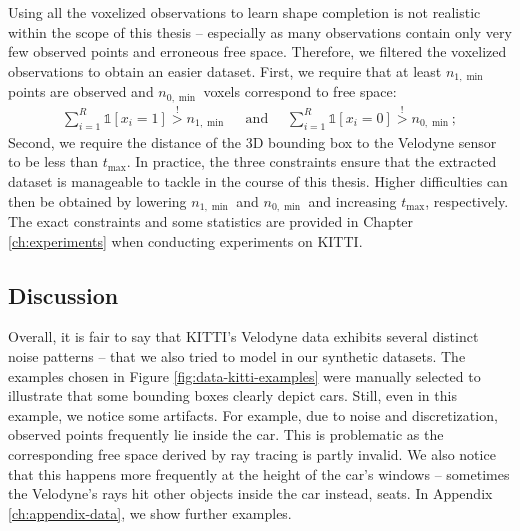 Using all the voxelized observations to learn shape completion is not
realistic within the scope of this thesis -- especially as many
observations contain only very few observed points and erroneous free space.
Therefore, we filtered the voxelized observations to obtain an easier
dataset. First, we require that at least
$n_{1,\min}$ points are observed and $n_{0, \min}$ voxels correspond
to free space:
\begin{align}
  \sum_{i = 1}^R \mathds{1}[x_i = 1] \overset{!}{>} n_{1,\min}\quad\text{ and }\quad\sum_{i = 1}^R \mathds{1}[x_i = 0] \overset{!}{>} n_{0,\min};
\end{align}
Second, we require the distance of the 3D bounding
box to the Velodyne sensor to be less than $t_{\max}$. In practice, the
three constraints ensure that the extracted dataset is manageable to tackle
in the course of this thesis. Higher difficulties can then
be obtained by lowering $n_{1,\min}$ and $n_{0,\min}$ and increasing $t_{\max}$,
respectively. The exact constraints and some statistics are provided in
Chapter \ref{ch:experiments} when conducting experiments on KITTI.

\subsection{Discussion}

Overall, it is fair to say that KITTI's Velodyne data exhibits several
distinct noise patterns -- that we also tried to model in our synthetic datasets.
The examples chosen in Figure \ref{fig:data-kitti-examples} were manually selected to
illustrate that some bounding boxes clearly depict cars. Still, even in this example,
we notice some artifacts. For example, due to noise and discretization, observed
points frequently lie inside the car. This is problematic as the corresponding
free space derived by ray tracing is partly invalid. We also notice that this 
happens more frequently at the height of the car's windows -- 
sometimes the Velodyne's rays hit other objects inside the
car instead, \eg seats. In Appendix \ref{ch:appendix-data}, we show further
examples.
